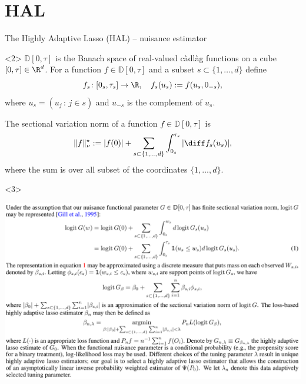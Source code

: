 \documentclass[smaller]{beamer}\usepackage{listings}
\begin{document}
\section{HAL}
\label{sec:org647380e}
\begin{frame}[label={sec:org211062e}]{The Highly Adaptive Lasso (HAL) -- nuisance estimator}
\begin{onlyenv}<2>
\(\mathbb{D}[0, \tau]\) is the Banach space of real-valued càdlàg functions on a cube \([0,\tau]
   \in \R^d\). For a function \(f \in \mathbb{D}[0, \tau]\) and a subset \(s \subset \{1, \dots, d\}\)
define
\begin{equation*}
  f_s \colon [0_s, \tau_s] \rightarrow \R, \quad f_s(u_s) := f(u_s, 0_{-s}),
\end{equation*}
where \(u_s = (u_j \, : \, j \in s)\) and \(u_{-s}\) is the complement of \(u_s\). 

\vfill

The sectional variation norm of a function \(f \in \mathbb{D}[0, \tau]\) is
\begin{equation*}
  \Vert f \Vert_{\nu}^{\star} := |f(0)| + \sum_{s \subset \{1, \dots, d \}}\int_{0_s}^{\tau_s}  |\diff f_s(u_s)|,
\end{equation*}
where the sum is over all subset of the coordinates \(\{1, \dots, d\}\).
\end{onlyenv}

\begin{onlyenv}<3>
\begin{center}
\includegraphics[width=1.03\textwidth]{./screenshots/hal.png}
\end{center}
\end{onlyenv}
\end{frame}
\end{document}
